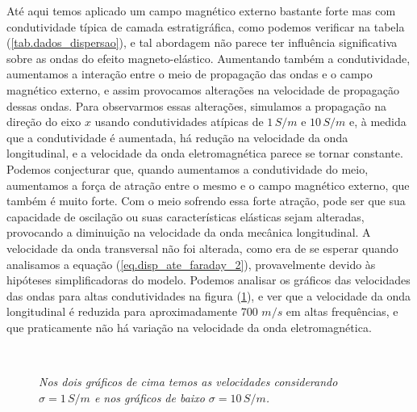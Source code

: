 At\'e aqui temos aplicado um campo magn\'etico externo bastante forte mas com condutividade t\'ipica de camada estratigr\'afica, como podemos verificar na tabela (\ref{tab.dados_dispersao}), e tal abordagem n\~ao parece ter influ\^encia significativa sobre as ondas do efeito magneto-el\'astico. Aumentando tamb\'em a condutividade, aumentamos a intera\c{c}\~ao entre o meio de propaga\c{c}\~ao das ondas e o campo magn\'etico externo, e assim provocamos altera\c{c}\~oes na velocidade de propaga\c{c}\~ao dessas ondas. Para observarmos essas altera\c{c}\~oes, simulamos a propaga\c{c}\~ao na dire\c{c}\~ao do eixo $x$ usando condutividades at\'ipicas de $1\,S/m$ e $10\,S/m$ e, \`a medida que a condutividade \'e aumentada, h\'a redu\c{c}\~ao na velocidade da onda longitudinal, e a velocidade da onda eletromagn\'etica parece se tornar constante. Podemos conjecturar que, quando aumentamos a condutividade do meio, aumentamos a for\c{c}a de atra\c{c}\~ao entre o mesmo e o campo magn\'etico externo, que tamb\'em \'e muito forte. Com o meio sofrendo essa forte atra\c{c}\~ao, pode ser que sua capacidade de oscila\c{c}\~ao ou suas caracter\'isticas el\'asticas sejam alteradas, provocando a diminui\c{c}\~ao na velocidade da onda mec\^anica longitudinal. A velocidade da onda transversal n\~ao foi alterada, como era de se esperar quando analisamos a equa\c{c}\~ao (\ref{eq.disp_ate_faraday_2}), provavelmente devido \`as hip\'oteses simplificadoras do modelo. Podemos analisar os gr\'aficos das velocidades das ondas para altas condutividades na figura (\ref{fig.disp_fa_x_sig}), e ver que a velocidade da onda longitudinal \'e reduzida para aproximadamente 700 $m/s$ em altas frequ\^encias, e que praticamente n\~ao h\'a varia\c{c}\~ao na velocidade da onda eletromagn\'etica. 

\begin{figure}
\centering
{}
\\
\caption{\textit{Nos dois gr\'aficos de cima temos as velocidades considerando $\sigma=1\,S/m$ e nos gr\'aficos de baixo $\sigma=10\,S/m$.}}
\label{fig.disp_fa_x_sig}
\end{figure}


